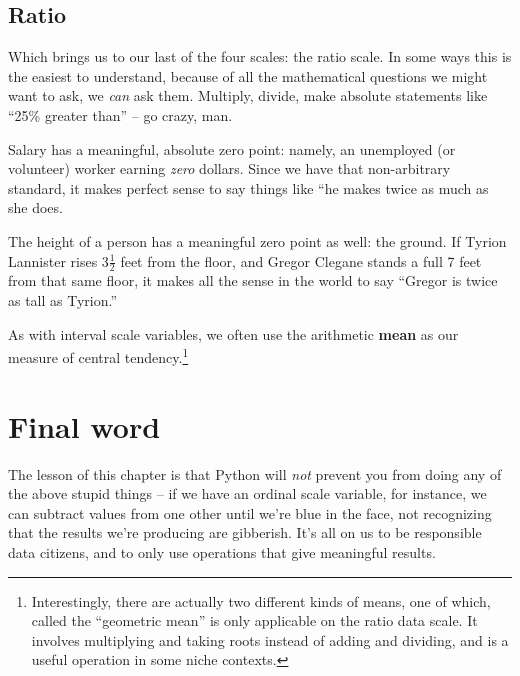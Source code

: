 \subsection{Ratio}

Which brings us to our last of the four scales: the ratio scale. In some ways
this is the easiest to understand, because of all the mathematical questions
we might want to ask, we \textit{can} ask them. Multiply, divide, make 
absolute statements like ``25\% greater than'' -- go crazy, man.

Salary has a meaningful, absolute zero point: namely, an unemployed (or
volunteer) worker earning \textit{zero} dollars. Since we have that
non-arbitrary standard, it makes perfect sense to say things like ``he makes
twice as much as she does.

The height of a person has a meaningful zero point as well: the ground. If
Tyrion Lannister rises $3\frac{1}{2}$ feet from the floor, and Gregor Clegane
stands a full 7 feet from that same floor, it makes all the sense in the world
to say ``Gregor is twice as tall as Tyrion.''

As with interval scale variables, we often use the arithmetic \textbf{mean}  as
our measure of central tendency.\footnote{Interestingly, there are actually two
different kinds of means, one of which, called the ``geometric mean'' is only
applicable on the ratio data scale. It involves multiplying and taking roots
instead of adding and dividing, and is a useful operation in some niche
contexts.}

\section{Final word}
The lesson of this chapter is that Python will \textit{not} prevent you from
doing any of the above stupid things -- if we have an ordinal scale variable,
for instance, we can subtract values from one other until we're blue in the
face, not recognizing that the results we're producing are gibberish. It's all
on us to be responsible data citizens, and to only use operations that give
meaningful results.

